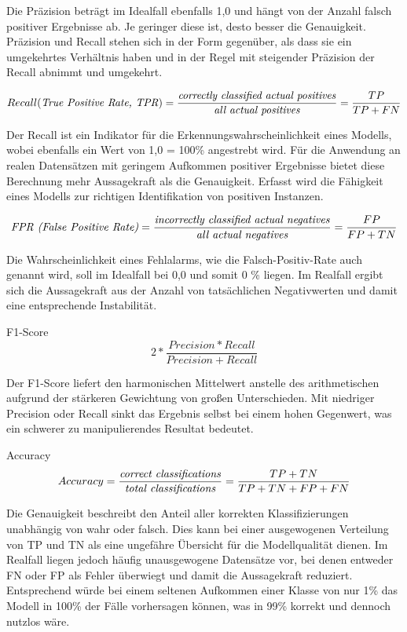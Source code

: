 Die Präzision beträgt im Idealfall ebenfalls 1,0 und hängt von der Anzahl falsch positiver Ergebnisse ab. Je geringer diese ist, desto besser die Genauigkeit. Präzision und Recall stehen sich in der Form gegenüber, als dass sie ein umgekehrtes Verhältnis haben und in der Regel mit steigender Präzision der Recall abnimmt und umgekehrt.

\begin{equation}
    Recall (\mbox{\textit{True Positive Rate, TPR}}) = \frac{\mbox{\textit{correctly classified actual positives}}}{\mbox{\textit{all actual positives}}} = \frac{TP}{TP + FN}
\end{equation}

Der Recall ist ein Indikator für die Erkennungswahrscheinlichkeit eines Modells, wobei ebenfalls ein Wert von 1,0 = 100\% angestrebt wird. Für die Anwendung an realen Datensätzen mit geringem Aufkommen positiver Ergebnisse bietet diese Berechnung mehr Aussagekraft als die Genauigkeit. Erfasst wird die Fähigkeit eines Modells zur richtigen Identifikation von positiven Instanzen.

\begin{equation}
    \mbox{\textit{FPR (False Positive Rate)}} = \frac{\mbox{\textit{incorrectly classified actual negatives}}}{\mbox{\textit{all actual negatives}}} = \frac{FP}{FP + TN}
\end{equation}

Die Wahrscheinlichkeit eines Fehlalarms, wie die Falsch-Positiv-Rate auch genannt wird, soll im Idealfall bei 0,0 und somit 0 \% liegen. Im Realfall ergibt sich die Aussagekraft aus der Anzahl von tatsächlichen Negativwerten und damit eine entsprechende Instabilität.

F1-Score
\begin{equation}
    2 * \frac{Precision * Recall}{Precision + Recall}
\end{equation}

Der F1-Score liefert den harmonischen Mittelwert anstelle des arithmetischen aufgrund der stärkeren Gewichtung von großen Unterschieden. Mit niedriger Precision oder Recall sinkt das Ergebnis selbst bei einem hohen Gegenwert, was ein schwerer zu manipulierendes Resultat bedeutet.

Accuracy
\begin{equation}
    Accuracy = \frac{\mbox{\textit{correct classifications}}}{\mbox{\textit{total classifications}}} = \frac{TP + TN}{TP + TN + FP + FN}
\end{equation}

Die Genauigkeit beschreibt den Anteil aller korrekten Klassifizierungen unabhängig von wahr oder falsch. Dies kann bei einer ausgewogenen Verteilung von TP und TN als eine ungefähre Übersicht für die Modellqualität dienen. Im Realfall liegen jedoch häufig unausgewogene Datensätze vor, bei denen entweder FN oder FP als Fehler überwiegt und damit die Aussagekraft reduziert. Entsprechend würde bei einem seltenen Aufkommen einer Klasse von nur 1\% das Modell in 100\% der Fälle  vorhersagen können, was in 99\% korrekt und dennoch nutzlos wäre.

